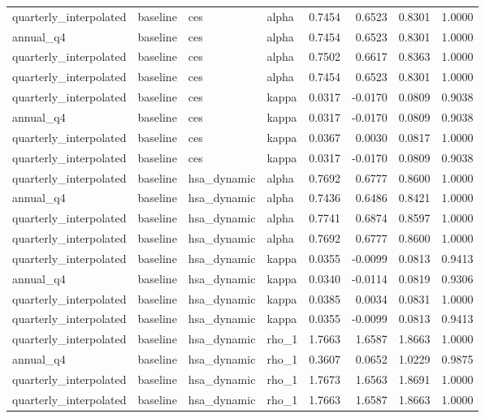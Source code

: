 \begin{tabular}{llllrrrr}
quarterly\_interpolated & baseline & ces & alpha & 0.7454 & 0.6523 & 0.8301 & 1.0000 \\
annual\_q4 & baseline & ces & alpha & 0.7454 & 0.6523 & 0.8301 & 1.0000 \\
quarterly\_interpolated & baseline & ces & alpha & 0.7502 & 0.6617 & 0.8363 & 1.0000 \\
quarterly\_interpolated & baseline & ces & alpha & 0.7454 & 0.6523 & 0.8301 & 1.0000 \\
quarterly\_interpolated & baseline & ces & kappa & 0.0317 & -0.0170 & 0.0809 & 0.9038 \\
annual\_q4 & baseline & ces & kappa & 0.0317 & -0.0170 & 0.0809 & 0.9038 \\
quarterly\_interpolated & baseline & ces & kappa & 0.0367 & 0.0030 & 0.0817 & 1.0000 \\
quarterly\_interpolated & baseline & ces & kappa & 0.0317 & -0.0170 & 0.0809 & 0.9038 \\
quarterly\_interpolated & baseline & hsa\_dynamic & alpha & 0.7692 & 0.6777 & 0.8600 & 1.0000 \\
annual\_q4 & baseline & hsa\_dynamic & alpha & 0.7436 & 0.6486 & 0.8421 & 1.0000 \\
quarterly\_interpolated & baseline & hsa\_dynamic & alpha & 0.7741 & 0.6874 & 0.8597 & 1.0000 \\
quarterly\_interpolated & baseline & hsa\_dynamic & alpha & 0.7692 & 0.6777 & 0.8600 & 1.0000 \\
quarterly\_interpolated & baseline & hsa\_dynamic & kappa & 0.0355 & -0.0099 & 0.0813 & 0.9413 \\
annual\_q4 & baseline & hsa\_dynamic & kappa & 0.0340 & -0.0114 & 0.0819 & 0.9306 \\
quarterly\_interpolated & baseline & hsa\_dynamic & kappa & 0.0385 & 0.0034 & 0.0831 & 1.0000 \\
quarterly\_interpolated & baseline & hsa\_dynamic & kappa & 0.0355 & -0.0099 & 0.0813 & 0.9413 \\
quarterly\_interpolated & baseline & hsa\_dynamic & rho\_1 & 1.7663 & 1.6587 & 1.8663 & 1.0000 \\
annual\_q4 & baseline & hsa\_dynamic & rho\_1 & 0.3607 & 0.0652 & 1.0229 & 0.9875 \\
quarterly\_interpolated & baseline & hsa\_dynamic & rho\_1 & 1.7673 & 1.6563 & 1.8691 & 1.0000 \\
quarterly\_interpolated & baseline & hsa\_dynamic & rho\_1 & 1.7663 & 1.6587 & 1.8663 & 1.0000 \\

\end{tabular}
